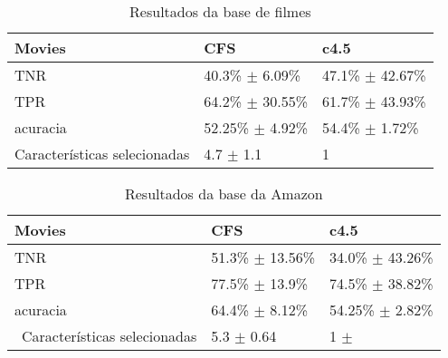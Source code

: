 \begin{table}[!h]
    \begin{tabular}{lll}
    Movies         				 				& CFS                                 	 	& c4.5                                  \\ \hline
    TNR                   						& 40.3\% $\pm$ 6.09\% 			 	& 47.1\% $\pm$ 42.67\% \\
    TPR                        					& 64.2\% $\pm$ 30.55\% 		    & 61.7\% $\pm$ 43.93\% \\
    acuracia                   				& 52.25\% $\pm$ 4.92\% 			 & 54.4\% $\pm$ 1.72\% \\
    Características selecionadas & 4.7 $\pm$ 1.1            			 	 & 1                                     \\
    \end{tabular}
    \caption{Resultados da base de filmes}
	\label{table:movies}
\end{table}




%

\begin{table}[!h]
    \begin{tabular}{lll}
    Movies         										& CFS                          		& c4.5                                  \\ \hline
    TNR                     								& 51.3\% $\pm$ 13.56\% 	& 34.0\% $\pm$ 43.26\%  \\
    TPR                          						& 77.5\% $\pm$ 13.9\% 		& 74.5\% $\pm$ 38.82\% \\
    acuracia                     					& 64.4\% $\pm$ 8.12\% 		& 54.25\% $\pm$ 2.82\% \\\
    Características selecionadas 		& 5.3 $\pm$ 0.64               & 1 $\pm$                                  \\
    \end{tabular}
    \caption{Resultados da base da Amazon}
	\label{table:amazon}
\end{table}


